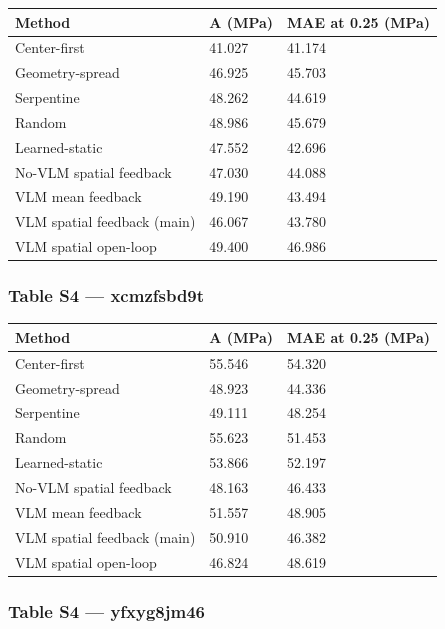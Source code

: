 \documentclass[11pt,a4paper]{article}
\begin{document}
{ %
\begin{longtable}[]{@{}lll@{}}
\toprule\noalign{}
Method & A (MPa) & MAE at 0.25 (MPa) \\
\midrule\noalign{}
\endhead
\bottomrule\noalign{}
\endlastfoot
Center-first & 41.027 & 41.174 \\
Geometry-spread & 46.925 & 45.703 \\
Serpentine & 48.262 & 44.619 \\
Random & 48.986 & 45.679 \\
Learned-static & 47.552 & 42.696 \\
No-VLM spatial feedback & 47.030 & 44.088 \\
VLM mean feedback & 49.190 & 43.494 \\
VLM spatial feedback (main) & 46.067 & 43.780 \\
VLM spatial open-loop & 49.400 & 46.986 \\
\end{longtable}
}

\subsubsection{Table S4 --- xcmzfsbd9t}\label{table-s4-xcmzfsbd9t}

{ %
\begin{longtable}[]{@{}lll@{}}
\toprule\noalign{}
Method & A (MPa) & MAE at 0.25 (MPa) \\
\midrule\noalign{}
\endhead
\bottomrule\noalign{}
\endlastfoot
Center-first & 55.546 & 54.320 \\
Geometry-spread & 48.923 & 44.336 \\
Serpentine & 49.111 & 48.254 \\
Random & 55.623 & 51.453 \\
Learned-static & 53.866 & 52.197 \\
No-VLM spatial feedback & 48.163 & 46.433 \\
VLM mean feedback & 51.557 & 48.905 \\
VLM spatial feedback (main) & 50.910 & 46.382 \\
VLM spatial open-loop & 46.824 & 48.619 \\
\end{longtable}
}

\subsubsection{Table S4 --- yfxyg8jm46}\label{table-s4-yfxyg8jm46}
\end{document}
